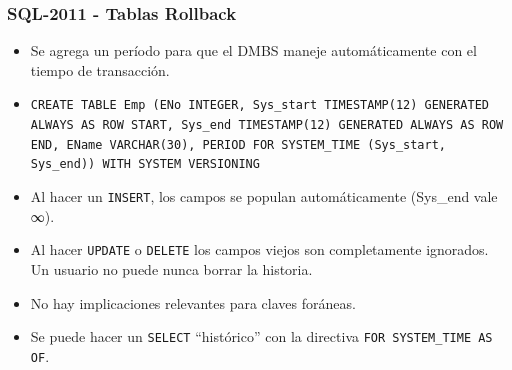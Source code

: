 \begin{frame}
\frametitle{SQL-2011 - Tablas Rollback}
	\begin{itemize}
	\item	Se agrega un período para que el DMBS maneje automáticamente
		con el tiempo de transacción.
	\pause

	\item	\texttt{CREATE TABLE Emp (ENo INTEGER, Sys\_start
		TIMESTAMP(12) GENERATED ALWAYS AS ROW START,
		Sys\_end TIMESTAMP(12) GENERATED ALWAYS AS ROW
		END, EName VARCHAR(30), PERIOD FOR SYSTEM\_TIME
		(Sys\_start, Sys\_end)) WITH SYSTEM VERSIONING}
	\pause

	\item	Al hacer un \texttt{INSERT}, los campos se populan automáticamente
		(Sys\_end vale ∞).
	\pause

	\item	Al hacer \texttt{UPDATE} o \texttt{DELETE} los campos viejos
		son completamente ignorados. Un usuario no puede nunca borrar
		la historia.
	\pause

	\item	No hay implicaciones relevantes para claves foráneas.
	\pause

	\item	Se puede hacer un \texttt{SELECT} ``histórico'' con la directiva
		\texttt{FOR SYSTEM\_TIME AS OF}.

	\end{itemize}
\end{frame}
